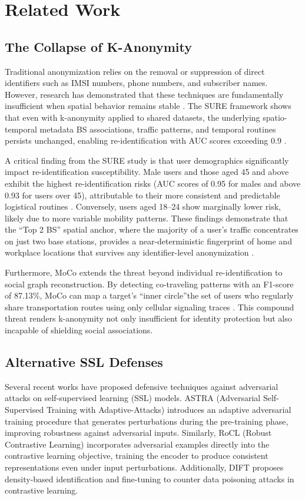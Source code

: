 \section{Related Work}\label{sec:related_work}

\subsection{The Collapse of K-Anonymity}
Traditional anonymization relies on the removal or suppression of direct identifiers such as IMSI numbers, phone numbers, and subscriber names. However, research has demonstrated that these techniques are fundamentally insufficient when spatial behavior remains stable \cite{duan2025sure}. The SURE framework shows that even with k-anonymity applied to shared datasets, the underlying spatio-temporal metadata BS associations, traffic patterns, and temporal routines persists unchanged, enabling re-identification with AUC scores exceeding 0.9 \cite{duan2025sure}.

A critical finding from the SURE study is that user demographics significantly impact re-identification susceptibility. Male users and those aged 45 and above exhibit the highest re-identification risks (AUC scores of 0.95 for males and above 0.93 for users over 45), attributable to their more consistent and predictable logistical routines \cite{duan2025sure}. Conversely, users aged 18--24 show marginally lower risk, likely due to more variable mobility patterns. These findings demonstrate that the ``Top 2 BS'' spatial anchor, where the majority of a user's traffic concentrates on just two base stations, provides a near-deterministic fingerprint of home and workplace locations that survives any identifier-level anonymization \cite{duan2025sure}.

Furthermore, MoCo \cite{duan2025moco} extends the threat beyond individual re-identification to social graph reconstruction. By detecting co-traveling patterns with an F1-score of 87.13\%, MoCo can map a target's ``inner circle''the set of users who regularly share transportation routes using only cellular signaling traces \cite{duan2025moco}. This compound threat renders k-anonymity not only insufficient for identity protection but also incapable of shielding social associations.

\subsection{Alternative SSL Defenses}
Several recent works have proposed defensive techniques against adversarial attacks on self-supervised learning (SSL) models. ASTRA (Adversarial Self-Supervised Training with Adaptive-Attacks) \cite{chhipa2025astra} introduces an adaptive adversarial training procedure that generates perturbations during the pre-training phase, improving robustness against adversarial inputs. Similarly, RoCL (Robust Contrastive Learning) \cite{kim2020rocl} incorporates adversarial examples directly into the contrastive learning objective,
training the encoder to produce consistent representations even under input perturbations. Additionally, DIFT \cite{zhu2026dift} proposes density-based identification and fine-tuning to counter data poisoning attacks in contrastive learning.

